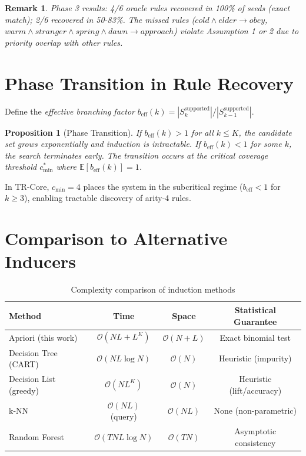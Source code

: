 \documentclass[11pt]{article}
\newcommand{\E}{\mathbb{E}}
\newcommand{\Oh}{\mathcal{O}}
\newtheorem{proposition}{Proposition}
\newtheorem{remark}{Remark}
\begin{document}
\begin{remark}
Phase 3 results: 4/6 oracle rules recovered in 100\% of seeds (exact match); 2/6 recovered in 50-83\%. The missed rules (\texttt{$cold\land elder\to obey$}, \texttt{$warm\land stranger\land spring\land dawn\to approach$}) violate Assumption 1 or 2 due to priority overlap with other rules.
\end{remark}

\section{Phase Transition in Rule Recovery}

Define the \emph{effective branching factor} $b_{\text{eff}}(k) = |S_k^{\text{supported}}| / |S_{k-1}^{\text{supported}}|$.

\begin{proposition}[Phase Transition]
If $b_{\text{eff}}(k) > 1$ for all $k \leq K$, the candidate set grows exponentially and induction is intractable. If $b_{\text{eff}}(k) < 1$ for some $k$, the search terminates early. The transition occurs at the critical coverage threshold $c_{\min}^*$ where $\E[b_{\text{eff}}(k)] = 1$.
\end{proposition}

In TR-Core, $c_{\min}=4$ places the system in the subcritical regime ($b_{\text{eff}} < 1$ for $k \geq 3$), enabling tractable discovery of arity-4 rules.

\section{Comparison to Alternative Inducers}

\begin{table}[htbp]
\centering
\caption{Complexity comparison of induction methods}
\begin{tabular}{lccc}
\toprule
Method & Time & Space & Statistical Guarantee \\
\midrule
Apriori (this work) & $\Oh(NL + L^K)$ & $\Oh(N + L)$ & Exact binomial test \\
Decision Tree (CART) & $\Oh(N L \log N)$ & $\Oh(N)$ & Heuristic (impurity) \\
Decision List (greedy) & $\Oh(N L^K)$ & $\Oh(N)$ & Heuristic (lift/accuracy) \\
k-NN & $\Oh(N L)$ (query) & $\Oh(N L)$ & None (non-parametric) \\
Random Forest & $\Oh(T N L \log N)$ & $\Oh(T N)$ & Asymptotic consistency \\
\bottomrule
\end{tabular}
\end{table}
\end{document}
